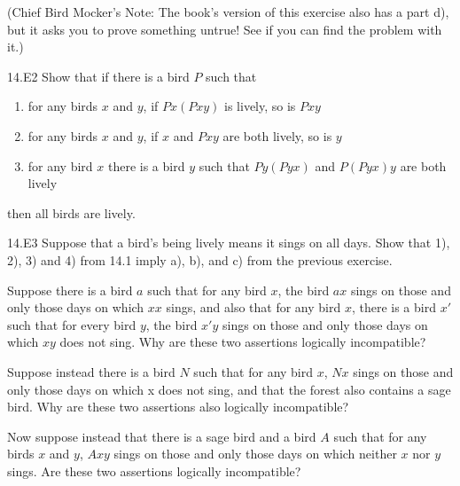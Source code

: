 \documentclass[12pt, letterpaper]{article}
\begin{document}
\vspace{6pt}
\noindent (Chief Bird Mocker's Note: The book's version of this exercise also has a part d), but it asks you to prove something untrue! See if you can find the problem with it.)

\begin{prob}{14.E2}
Show that if there is a bird $P$ such that

\begin{enumerate}[label=\textbf{\alph*)},itemsep=0mm]
  \item for any birds $x$ and $y$, if $Px(Pxy)$ is lively, so is $Pxy$
  \item for any birds $x$ and $y$, if $x$ and $Pxy$ are both lively, so is $y$
  \item for any bird $x$ there is a bird $y$ such that $Py(Pyx)$ and $P(Pyx)y$ are both lively
\end{enumerate}

\noindent then all birds are lively.
\end{prob}

\begin{prob}{14.E3}
Suppose that a bird's being lively means it sings on all days. Show that 1), 2), 3) and 4) from 14.1 imply a), b), and c) from the previous exercise.
\end{prob}

\begin{prob}{15.1} 
Suppose there is a bird $a$ such that for any bird $x$, the bird $ax$ sings on those and only those days on which $xx$ sings, and also that for any bird $x$, there is a bird $x'$ such that for every bird $y$, the bird $x'y$ sings on those and only those days on which $xy$ does not sing. Why are these two assertions logically incompatible?
\end{prob}

\begin{prob}{15.2} 
Suppose instead there is a bird $N$ such that for any bird $x$, $Nx$ sings on those and only those days on which x does not sing, and that the forest also contains a sage bird. Why are these two assertions also logically incompatible?
\end{prob}

\begin{prob}{15.3} 
Now suppose instead that there is a sage bird and a bird $A$ such that for any birds $x$ and $y$, $Axy$ sings on those and only those days on which neither $x$ nor $y$ sings. Are these two assertions logically incompatible?
\end{prob}
\end{document}
